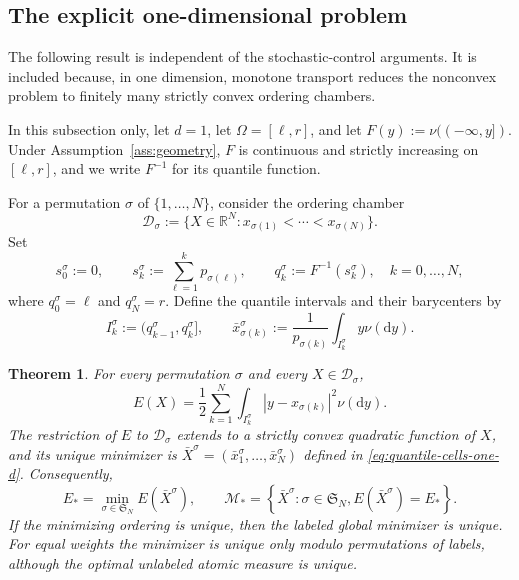 \documentclass[11pt]{article}
\def\R{\mathbb{R}}
\def\Dc{{\mathcal D}}
\def\Mc{{\mathcal M}}
\newcommand{\dd}{\mathrm{d}}
\newtheorem{theorem}{Theorem}[section]
\theoremstyle{definition}
\theoremstyle{remark}
\numberwithin{equation}{section}
\begin{document}
\subsection{The explicit one-dimensional problem}\label{sec:one-dimensional}

The following result is independent of the stochastic-control arguments.  It is included because,
in one dimension, monotone transport reduces the nonconvex problem to finitely many strictly convex
ordering chambers.

In this subsection only, let $d=1$, let $\Omega=[\ell,r]$, and let
$F(y):=\nu((-\infty,y])$.  Under Assumption~\ref{ass:geometry}, $F$ is continuous and strictly
increasing on $[\ell,r]$, and we write $F^{-1}$ for its quantile function.

For a permutation $\sigma$ of $\{1,\ldots,N\}$, consider the ordering chamber
\begin{equation}\label{eq:ordering-chamber}
 \Dc_\sigma:=\{X\in\R^N:x_{\sigma(1)}<\cdots<x_{\sigma(N)}\}.
\end{equation}
Set
\begin{equation}\label{eq:cumulative-masses-one-d}
 s_0^\sigma:=0,
 \qquad
 s_k^\sigma:=\sum_{\ell=1}^kp_{\sigma(\ell)},
 \qquad
 q_k^\sigma:=F^{-1}(s_k^\sigma),
 \quad k=0,\ldots,N,
\end{equation}
where $q_0^\sigma=\ell$ and $q_N^\sigma=r$.  Define the quantile intervals and their barycenters by
\begin{equation}\label{eq:quantile-cells-one-d}
 I_k^\sigma:=(q_{k-1}^\sigma,q_k^\sigma],
 \qquad
 \bar x_{\sigma(k)}^\sigma
 :=\frac1{p_{\sigma(k)}}\int_{I_k^\sigma}y\nu(\dd y).
\end{equation}

\begin{theorem}\label{thm:one-dimensional}
For every permutation $\sigma$ and every $X\in\Dc_\sigma$,
\begin{equation}\label{eq:E-one-dimensional}
 E(X)=\frac12\sum_{k=1}^N
 \int_{I_k^\sigma}|y-x_{\sigma(k)}|^2\nu(\dd y).
\end{equation}
The restriction of $E$ to $\Dc_\sigma$ extends to a strictly convex quadratic function of $X$, and
its unique minimizer is $\bar X^\sigma=(\bar x_1^\sigma,\ldots,\bar x_N^\sigma)$ defined in
\eqref{eq:quantile-cells-one-d}.  Consequently,
\begin{equation}\label{eq:global-one-d}
 E_*=\min_{\sigma\in\mathfrak S_N}E(\bar X^\sigma),
 \qquad
 \Mc_*=\left\{\bar X^\sigma:\sigma\in\mathfrak S_N,
 E(\bar X^\sigma)=E_*\right\}.
\end{equation}
If the minimizing ordering is unique, then the labeled global minimizer is unique.  For equal
weights the minimizer is unique only modulo permutations of labels, although the optimal unlabeled
atomic measure is unique.
\end{theorem}
\end{document}
